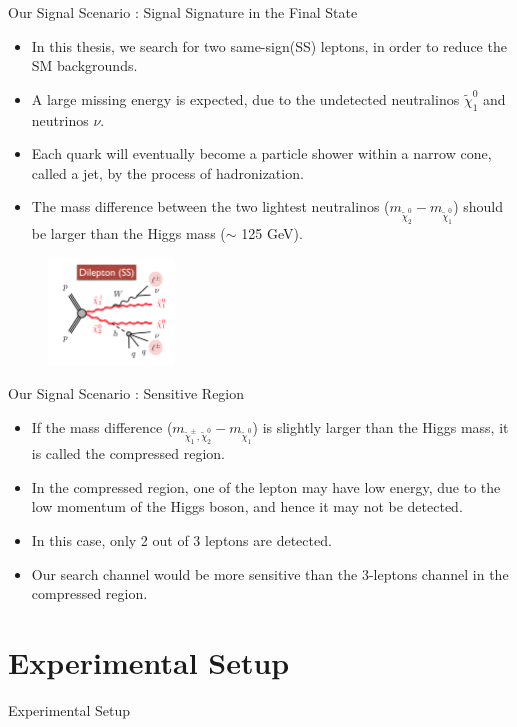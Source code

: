 \documentclass[mathserif,serif]{beamer}
\begin{document}
\begin{frame}{Our Signal Scenario : Signal Signature in the Final State}
\begin{itemize}
\item In this thesis, we search for two same-sign(SS) leptons, in order to reduce the SM backgrounds.
\item A large missing energy is expected, due to the undetected neutralinos $\tilde{\chi}_1^0$ and neutrinos $\nu$.
\item Each quark will eventually become a particle shower within a narrow cone, called a jet, by the process of hadronization.
\item The mass difference between the two lightest neutralinos ($m_{\tilde{\chi}_2^0} - m_{\tilde{\chi}_1^0}$) should be larger than the Higgs mass ($\sim$ 125 GeV).
\end{itemize}
\begin{figure}
\centering
\includegraphics[width=0.3\textwidth]{data/photo/theory/signal_feynman.png}
\end{figure}
\end{frame}

\begin{frame}{Our Signal Scenario : Sensitive Region}
\begin{itemize}
\item If the mass difference ($m_{\tilde{\chi}_1^\pm , \tilde{\chi}_2^0} - m_{\tilde{\chi}_1^0}$) is slightly larger than the Higgs mass, it is called the compressed region.
\item In the compressed region, one of the lepton may have low energy, due to the low momentum of the Higgs boson, and hence it may not be detected.
\item In this case, only 2 out of 3 leptons are detected.
\item Our search channel would be more sensitive than the 3-leptons channel in the compressed region.
\end{itemize}
\end{frame}

\section{Experimental Setup}
\begin{frame}
\begin{center}
\huge
Experimental Setup
\end{center}
\end{frame}
\end{document}
